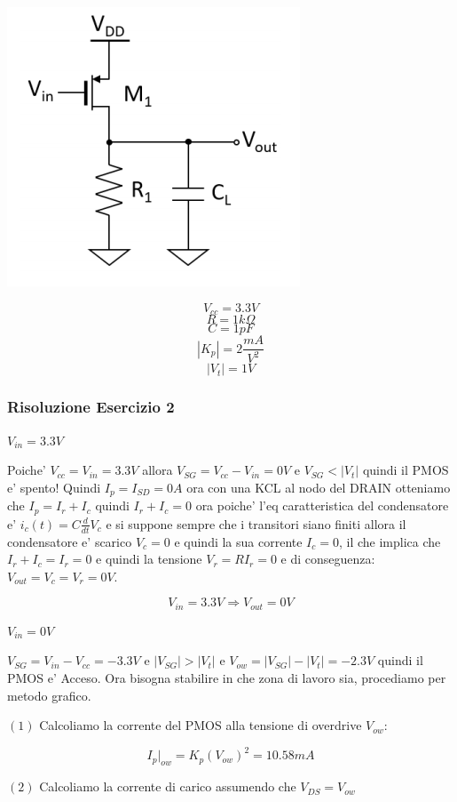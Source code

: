 \documentclass[\main/main.tex]{subfiles}
\begin{document}
\begin{center}
\includegraphics{esercizio2}
\end{center}
\[V_{cc} = 3.3V\]
\[R = 1k\Omega\]
\[C = 1pF\]
\[|K_p| = 2 \frac{mA}{V^2}\]
\[|V_t| = 1V\]

\clearpage
\subsubsection{Risoluzione Esercizio 2}
\textbf{$V_{in} = 3.3V$}

Poiche' $V_{cc} = V_{in} = 3.3V$ allora $V_{SG} = V_{cc} - V_{in} = 0V$ e 
$V_{SG} < |V_t|$ quindi il PMOS e' spento! Quindi $I_p = I_{SD} = 0A$ ora con una KCL al nodo del DRAIN otteniamo che $I_p = I_r + I_c$ quindi $I_r + I_c = 0$ ora poiche' l'eq caratteristica del condensatore e' $i_c(t) = C \frac{d}{dt}V_c$ e si suppone sempre che i transitori siano finiti allora il condensatore e' scarico $V_c = 0$ e quindi la sua corrente $I_c = 0$, il che implica che $I_r + I_c = I_r = 0$ e quindi la tensione $V_r = R I_r = 0$ e di conseguenza: $V_{out} = V_c = V_r = 0V$.

\[V_{in} = 3.3V \Rightarrow V_{out} = 0V\]

\textbf{$V_{in} = 0V$}

$V_{SG} = V_{in} - V_{cc} = -3.3V$ e $|V_{SG}| > |V_t|$ e $V_{ow} = |V_{SG}| - |V_t| = -2.3V$ quindi il PMOS e' Acceso.
Ora bisogna stabilire in che zona di lavoro sia, procediamo per metodo grafico.

$(1)$ Calcoliamo la corrente del PMOS alla tensione di overdrive $V_{ow}$:

\[I_p |_{ow} = K_p \left(V_{ow}\right)^2 = 10.58mA\]

$(2)$ Calcoliamo la corrente di carico assumendo che $V_{DS} = V_{ow}$
\end{document}
